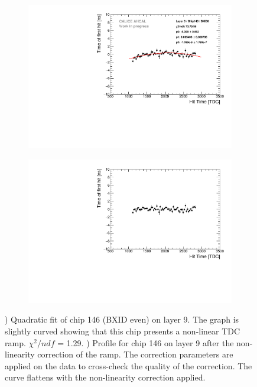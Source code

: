 \begin{figure}[htbp!]
	\begin{subfigure}[t]{0.5\textwidth}
		\centering
		\includegraphics[width=1\textwidth]{../Thesis_Plots/Timing/Muons/Plots/LinearityCorrection_Module09_Chip146_BXID0.pdf}
		\caption{}\label{fig:LinCorr}
	\end{subfigure}
	\hfill
	\begin{subfigure}[t]{0.5\textwidth}
		\centering
		\includegraphics[width=1\textwidth]{../Thesis_Plots/Timing/Muons/Plots/LinearityCorrection_Module09_Chip146_BXID0_Corrected.pdf}
		\caption{}\label{fig:LinCorr_2}
	\end{subfigure}
	\caption{) Quadratic fit of chip 146 (BXID even) on layer 9. The graph is slightly curved showing that this chip presents a non-linear TDC ramp. $\chi^2/ndf$ = 1.29. ) Profile for chip 146 on layer 9 after the non-linearity correction of the ramp. The correction parameters are applied on the data to cross-check the quality of the correction. The curve flattens with the non-linearity correction applied.}
\end{figure}

